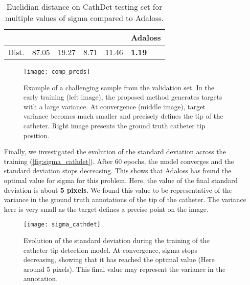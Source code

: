 \documentclass[10pt,twocolumn,letterpaper]{article}
\begin{document}
\begin{center}
  \begin{table}[t]
    \centering
  \begin{tabular}{|l|l|l|l|l|l|}
    \hline
    &  &  &  &  & Adaloss\\
    \hline
    Dist. & 87.05 & 19.27 & 8.71 & 11.46 & \textbf{1.19}\\
    \hline
  \end{tabular}
  \caption{Euclidian distance on CathDet testing set for multiple values
  of sigma compared to Adaloss.}
  \label{table:comp_acc_cathdet}
  \end{table}
\end{center}
\begin{figure}[h!]
  \begin{center}
	\texttt{[image: comp\_preds]}
	\caption{Example of a challenging sample from the validation
          set. In the early training (left image), the proposed method
          generates targets with a large variance. At convergence (middle image), target variance
          becomes much smaller and precisely defines the tip of the catheter.
          Right image presents the ground truth catheter tip position.}
	\label{fig:comp_preds}
  \end{center}
\end{figure}

Finally, we investigated the evolution of the standard deviation across 
the training (\autoref{fig:sigma_cathdet}). After 60 epochs, the model
converges and the standard deviation stops decreasing. This shows that
Adaloss has found the optimal value for sigma for this problem. Here,
the value of the final standard deviation is about \textbf{5 pixels}. We
found this value to be representative of the variance in the ground
truth annotations of the tip of the catheter. The variance here is
very small as the target defines a precise point on the image.

\begin{figure}[h]
  \begin{center}
    \centering
	\texttt{[image: sigma\_cathdet]}
	\caption{Evolution of the standard deviation during the training of the
	catheter tip detection model. At convergence, sigma stops decreasing, 
	showing that it has reached the optimal value (Here around 5 pixels).
	This final value may represent the variance in the annotation.}
	\label{fig:sigma_cathdet}
  \end{center}
\end{figure}
\end{document}
